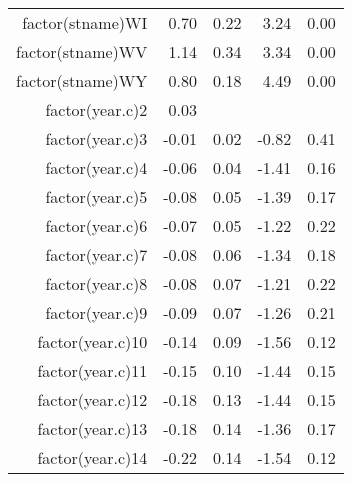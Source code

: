 \begin{table}[ht]
\begin{tabular}{rrrrr}
  factor(stname)WI & 0.70 & 0.22 & 3.24 & 0.00 \\ 
  factor(stname)WV & 1.14 & 0.34 & 3.34 & 0.00 \\ 
  factor(stname)WY & 0.80 & 0.18 & 4.49 & 0.00 \\ 
  factor(year.c)2 & 0.03 &  &  &  \\ 
  factor(year.c)3 & -0.01 & 0.02 & -0.82 & 0.41 \\ 
  factor(year.c)4 & -0.06 & 0.04 & -1.41 & 0.16 \\ 
  factor(year.c)5 & -0.08 & 0.05 & -1.39 & 0.17 \\ 
  factor(year.c)6 & -0.07 & 0.05 & -1.22 & 0.22 \\ 
  factor(year.c)7 & -0.08 & 0.06 & -1.34 & 0.18 \\ 
  factor(year.c)8 & -0.08 & 0.07 & -1.21 & 0.22 \\ 
  factor(year.c)9 & -0.09 & 0.07 & -1.26 & 0.21 \\ 
  factor(year.c)10 & -0.14 & 0.09 & -1.56 & 0.12 \\ 
  factor(year.c)11 & -0.15 & 0.10 & -1.44 & 0.15 \\ 
  factor(year.c)12 & -0.18 & 0.13 & -1.44 & 0.15 \\ 
  factor(year.c)13 & -0.18 & 0.14 & -1.36 & 0.17 \\ 
  factor(year.c)14 & -0.22 & 0.14 & -1.54 & 0.12 \\ 
   \hline
\end{tabular}
\end{table}
